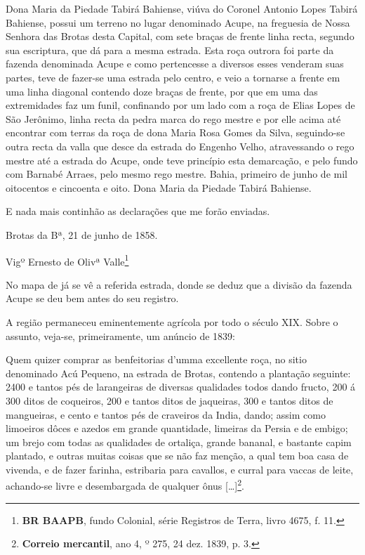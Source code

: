 \begin{citacao}
\begin{citacao}
Dona Maria da Piedade Tabirá Bahiense, viúva do Coronel Antonio Lopes Tabirá Bahiense, possui um terreno no lugar denominado Acupe, na freguesia de Nossa Senhora das Brotas desta Capital, com sete braças de frente linha recta, segundo sua escriptura, que dá para a mesma estrada. Esta roça outrora foi parte da fazenda denominada Acupe e como pertencesse a diversos esses venderam suas partes, teve de fazer-se uma estrada pelo centro, e veio a tornarse a frente em uma linha diagonal contendo doze braças de frente, por que em uma das extremidades faz um funil, confinando por um lado com a roça de Elias Lopes de São Jerônimo, linha recta da pedra marca do rego mestre e por elle acima até encontrar com terras da roça de dona Maria Rosa Gomes da Silva, seguindo-se outra recta da valla que desce da estrada do Engenho Velho, atravessando o rego mestre até a estrada do Acupe, onde teve princípio esta demarcação, e pelo fundo com Barnabé Arraes, pelo mesmo rego mestre. Bahia, primeiro de junho de mil oitocentos e cincoenta e oito. Dona Maria da Piedade Tabirá Bahiense.

E nada mais continhão as declarações que me forão enviadas.

Brotas da Bª, 21 de junho de 1858.

Vigº Ernesto de Olivª Valle\footnote{\textbf{BR BAAPB}, fundo Colonial, série Registros de Terra, livro 4675, f. 11.}
\end{citacao}

No mapa de  já se vê a referida estrada, donde se deduz que a divisão da fazenda Acupe se deu bem antes do seu registro. 

A região permaneceu eminentemente agrícola por todo o século XIX. Sobre o assunto, veja-se, primeiramente, um anúncio de 1839:

\begin{citacao}
Quem quizer comprar as benfeitorias d'umma excellente roça, no sitio denominado Acú Pequeno, na estrada de Brotas, contendo a plantação seguinte: 2400 e tantos pés de larangeiras de diversas qualidades todos dando fructo, 200 á 300 ditos de coqueiros, 200 e tantos ditos de jaqueiras, 300 e tantos ditos de mangueiras, e cento e tantos pés de craveiros da India, dando; assim como limoeiros dôces e azedos em grande quantidade, limeiras da Persia e de embigo; um brejo com todas as qualidades de ortaliça, grande bananal, e bastante capim plantado, e outras muitas coisas que se não faz menção, a qual tem boa casa de vivenda, e de fazer farinha, estribaria para cavallos, e curral para vaccas de leite, achando-se livre e desembargada de qualquer ônus [\dots]\footnote{\textbf{Correio mercantil}, ano 4, º 275, 24 dez. 1839, p. 3.}.
\end{citacao}


\end{citacao}
